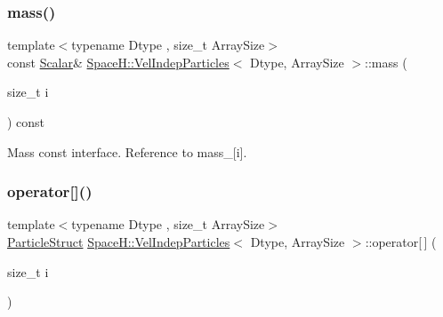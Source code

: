 \subsubsection{\texorpdfstring{mass()}{mass()}\hspace{0.1cm}{\footnotesize\ttfamily [2/2]}}
{\footnotesize\ttfamily template$<$typename Dtype , size\+\_\+t Array\+Size$>$ \\
const \mbox{\hyperlink{class_space_h_1_1_vel_indep_particles_aeb47d8131b30ed790320ff634f0d6af1}{Scalar}}\& \mbox{\hyperlink{class_space_h_1_1_vel_indep_particles}{Space\+H\+::\+Vel\+Indep\+Particles}}$<$ Dtype, Array\+Size $>$\+::mass (\begin{DoxyParamCaption}\item[{size\+\_\+t}]{i }\end{DoxyParamCaption}) const\hspace{0.3cm}{\ttfamily [inline]}}



Mass const interface. Reference to mass\+\_\+\mbox{[}i\mbox{]}. 

\mbox{\label{class_space_h_1_1_vel_indep_particles_ae9bb5b41cb491b23df12c819d253dcdb}} 
\subsubsection{\texorpdfstring{operator[]()}{operator[]()}}
{\footnotesize\ttfamily template$<$typename Dtype , size\+\_\+t Array\+Size$>$ \\
\mbox{\hyperlink{class_space_h_1_1_vel_indep_particles_ab20a7efcdf5e90bd1d073eb73be59120}{Particle\+Struct}} \mbox{\hyperlink{class_space_h_1_1_vel_indep_particles}{Space\+H\+::\+Vel\+Indep\+Particles}}$<$ Dtype, Array\+Size $>$\+::operator\mbox{[}$\,$\mbox{]} (\begin{DoxyParamCaption}\item[{size\+\_\+t}]{i }\end{DoxyParamCaption})\hspace{0.3cm}{\ttfamily [inline]}}

\mbox{\label{class_space_h_1_1_vel_indep_particles_a12c9a60ac96d922444e337b95749c806}} 
